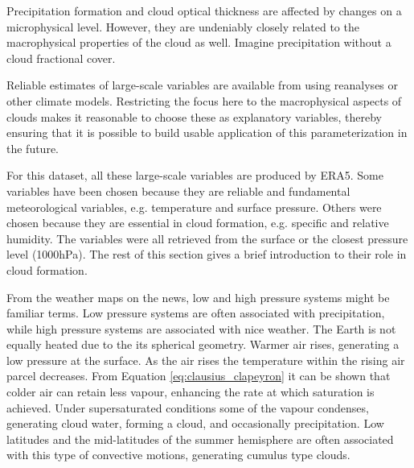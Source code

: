 Precipitation formation and cloud optical thickness are affected by changes on a microphysical level. However, they are undeniably closely related to the macrophysical properties of the cloud as well. Imagine precipitation without a cloud fractional cover. 

Reliable estimates of large-scale variables are available from using reanalyses or other climate models. Restricting the focus here to the macrophysical aspects of clouds makes it reasonable to choose these as explanatory variables, thereby ensuring that it is possible to build usable application of this parameterization in the future.

For this dataset, all these large-scale variables are produced by ERA5. Some variables have been chosen because they are reliable and fundamental meteorological variables, e.g. temperature and surface pressure. Others were chosen because they are essential in cloud formation, e.g. specific and relative humidity. The variables were all retrieved from the surface or the closest pressure level (1000hPa). The rest of this section gives a brief introduction to their role in cloud formation.

From the weather maps on the news, low and high pressure systems might be familiar terms. Low pressure systems are often associated with precipitation, while high pressure systems are associated with nice weather. The Earth is not equally heated due to the its spherical geometry. Warmer air rises, generating a low pressure at the surface. As the air rises the temperature within the rising air parcel decreases. From Equation \eqref{eq:clausius_clapeyron} it can be shown that colder air can retain less vapour, enhancing the rate at which saturation is achieved. Under supersaturated conditions some of the vapour condenses, generating cloud water, forming a cloud, and occasionally precipitation. Low latitudes and the mid-latitudes of the summer hemisphere are often associated with this type of convective motions, generating cumulus type clouds. 

